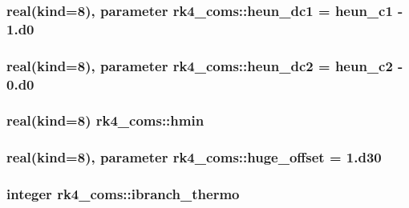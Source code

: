 \subsubsection[{\texorpdfstring{heun\+\_\+dc1}{heun_dc1}}]{\setlength{\rightskip}{0pt plus 5cm}real(kind=8), parameter rk4\+\_\+coms\+::heun\+\_\+dc1 = {\bf heun\+\_\+c1} -\/ 1.d0}\hypertarget{namespacerk4__coms_aeea9fe3a451738a304eacef0dfa174a1}{}\label{namespacerk4__coms_aeea9fe3a451738a304eacef0dfa174a1}
\subsubsection[{\texorpdfstring{heun\+\_\+dc2}{heun_dc2}}]{\setlength{\rightskip}{0pt plus 5cm}real(kind=8), parameter rk4\+\_\+coms\+::heun\+\_\+dc2 = {\bf heun\+\_\+c2} -\/ 0.d0}\hypertarget{namespacerk4__coms_ad638286586253a3741b0fd05bd2456a3}{}\label{namespacerk4__coms_ad638286586253a3741b0fd05bd2456a3}
\subsubsection[{\texorpdfstring{hmin}{hmin}}]{\setlength{\rightskip}{0pt plus 5cm}real(kind=8) rk4\+\_\+coms\+::hmin}\hypertarget{namespacerk4__coms_a5bf08e5e23fca150f09adc446272b7fb}{}\label{namespacerk4__coms_a5bf08e5e23fca150f09adc446272b7fb}
\subsubsection[{\texorpdfstring{huge\+\_\+offset}{huge_offset}}]{\setlength{\rightskip}{0pt plus 5cm}real(kind=8), parameter rk4\+\_\+coms\+::huge\+\_\+offset = 1.d30}\hypertarget{namespacerk4__coms_a09bb1518d1ed93891ef24fa73feb7cbe}{}\label{namespacerk4__coms_a09bb1518d1ed93891ef24fa73feb7cbe}
\subsubsection[{\texorpdfstring{ibranch\+\_\+thermo}{ibranch_thermo}}]{\setlength{\rightskip}{0pt plus 5cm}integer rk4\+\_\+coms\+::ibranch\+\_\+thermo}\hypertarget{namespacerk4__coms_a33cf51cec0937e19a61030894187ddbc}{}\label{namespacerk4__coms_a33cf51cec0937e19a61030894187ddbc}
